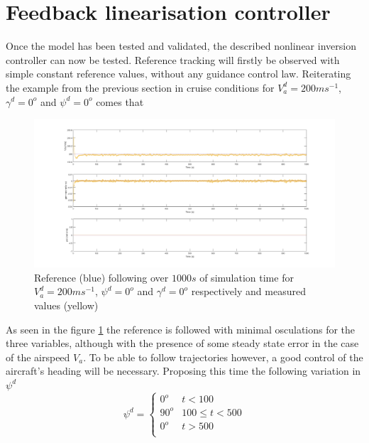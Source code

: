 \section{Feedback linearisation controller}
\label{section:results/fl_contro}

Once the model has been tested and validated, the described nonlinear inversion controller can now be tested. Reference tracking will firstly be observed with simple constant reference values, without any guidance control law. Reiterating the example from the previous section in cruise conditions for $V_a^d=200 ms^{-1}$, $\gamma^d = 0^o$ and $\psi^d = 0^o$ comes that
\begin{figure}[h]
\centering
\includegraphics[width=\textwidth]{Figures/Results/nli_test_const.png}
\caption[Constant reference following of feedback linearisation controller]{Reference (blue) following over $1000s$ of simulation time for $V_a^d=200 ms^{-1}$, $\psi^d = 0^o$ and $\gamma^d = 0^o$ respectively and measured values (yellow)}
\label{fig:const_ref}
\end{figure}

As seen in the figure \ref{fig:const_ref} the reference is followed with minimal osculations for the three variables, although with the presence of some steady state error in the case of the airspeed $V_a$. To be able to follow trajectories however, a good control of the aircraft's heading will be necessary. Proposing this time the following variation in $\psi^d$
\begin{equation}
\psi^d = \begin{cases}
0^o & t < 100\\
90^o & 100 \leq t < 500\\
0^o & t > 500 \\
\end{cases}
\label{eq:test_traj}
\end{equation}

